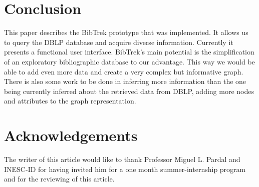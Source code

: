 \documentclass[twocolumn]{article}
\begin{document}
\section{Conclusion}
This paper describes the BibTrek prototype that was implemented. It allows us to query the DBLP database and acquire diverse information. Currently it presents a functional user interface. BibTrek's main potential is the simplification of an exploratory bibliographic database to our advantage. This way we would be able to add even more data and create a very complex but informative graph. There is also some work to be done in inferring more information than the one being currently inferred about the retrieved data from DBLP, adding more nodes and attributes to the graph representation.

\section*{Acknowledgements}
The writer of this article would like to thank Professor Miguel L. Pardal and INESC-ID for having invited him for a one month summer-internship program and for the reviewing of this article.
\end{document}
